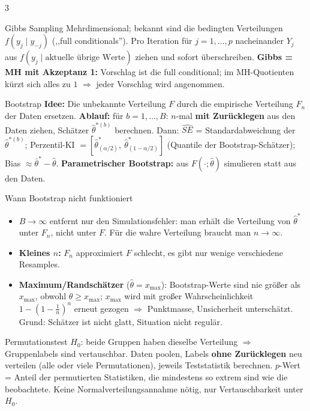 \documentclass[8pt,a4paper,landscape]{extarticle}
\newcommand{\ra}{$\Rightarrow$}
\begin{document}
\begin{multicols*}{3}
\begin{wissen}{Gibbs Sampling}
Mehrdimensional; bekannt sind die bedingten Verteilungen $f(y_j\mid y_{-j})$ (,,full conditionals''). Pro Iteration für $j=1,\dots,p$ nacheinander $Y_j$ aus $f(y_j\mid\text{aktuelle übrige Werte})$ ziehen und sofort überschreiben.
\textbf{Gibbs = MH mit Akzeptanz 1:} Vorschlag ist die full conditional; im MH-Quotienten kürzt sich alles zu $1$ \ra{} jeder Vorschlag wird angenommen.
\end{wissen}
\begin{wissen}{Bootstrap}
\textbf{Idee:} Die unbekannte Verteilung $F$ durch die empirische Verteilung $F_n$ der Daten ersetzen.
\textbf{Ablauf:} für $b=1,\dots,B$: $n$-mal \textbf{mit Zurücklegen} aus den Daten ziehen, Schätzer $\hat\theta^{*(b)}$ berechnen. Dann: $\widehat{SE}$ = Standardabweichung der $\hat\theta^{*(b)}$; Perzentil-KI $=[\hat\theta^*_{(\alpha/2)},\ \hat\theta^*_{(1-\alpha/2)}]$ (Quantile der Bootstrap-Schätzer); Bias $\approx\bar\theta^*-\hat\theta$.
\textbf{Parametrischer Bootstrap:} aus $F(\cdot;\hat\theta)$ simulieren statt aus den Daten.
\end{wissen}
\begin{falle}{Wann Bootstrap nicht funktioniert}
\begin{itemize}
\item $B\to\infty$ entfernt nur den Simulationsfehler: man erhält die Verteilung von $\hat\theta^*$ unter $F_n$, nicht unter $F$. Für die wahre Verteilung braucht man $n\to\infty$.
\item \textbf{Kleines $n$:} $F_n$ approximiert $F$ schlecht, es gibt nur wenige verschiedene Resamples.
\item \textbf{Maximum/Randschätzer} ($\hat\theta=x_{\max}$): Bootstrap-Werte sind nie größer als $x_{\max}$, obwohl $\theta\ge x_{\max}$; $x_{\max}$ wird mit großer Wahrscheinlichkeit $1-(1-\frac1n)^n$ erneut gezogen \ra{} Punktmasse, Unsicherheit unterschätzt. Grund: Schätzer ist nicht glatt, Situation nicht regulär.
\end{itemize}
\end{falle}
\begin{wissen}{Permutationstest}
$H_0$: beide Gruppen haben dieselbe Verteilung \ra{} Gruppenlabels sind vertauschbar. Daten poolen, Labels \textbf{ohne Zurücklegen} neu verteilen (alle oder viele Permutationen), jeweils Teststatistik berechnen. $p$-Wert = Anteil der permutierten Statistiken, die mindestens so extrem sind wie die beobachtete. Keine Normalverteilungsannahme nötig, nur Vertauschbarkeit unter $H_0$.
\end{wissen}


\end{multicols*}
\end{document}
